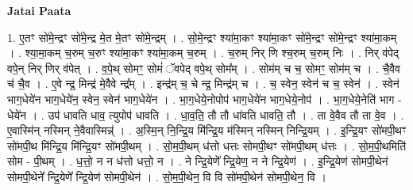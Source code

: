 \documentclass[17pt]{extarticle}
\begin{document}
\textbf{Jatai Paata} \newline

1. ए॒तꣳ सो॑मे॒न्द्रꣳ सो॑मे॒न्द्र मे॒त मे॒तꣳ सो॑मे॒न्द्रम् । . सो॒मे॒न्द्रꣳ श्या॑मा॒कꣳ श्या॑मा॒कꣳ सो॑मे॒न्द्रꣳ सो॑मे॒न्द्रꣳ श्या॑मा॒कम् । . श्या॒मा॒कम् च॒रुम् च॒रुꣳ श्या॑मा॒कꣳ श्या॑मा॒कम् च॒रुम् । . च॒रुम् निर् णि श्च॒रुम् च॒रुम् निः । . निर् व॑पेद् वपे॒न् निर् णिर् व॑पेत् । . व॒पे॒थ् सोमꣳ॒॒ सोमं॑ ॅवपेद् वपे॒थ् सोम᳚म् । . सोम॑म् च च॒ सोमꣳ॒॒ सोम॑म् च । . चै॒वैव च॑ चै॒व । . ए॒वे न्द्र॒ मिन्द्र॑ मे॒वैवे न्द्र᳚म् । . इन्द्र॑म् च॒ चे न्द्र॒ मिन्द्र॑म् च । . च॒ स्वेन॒ स्वेन॑ च च॒ स्वेन॑ । . स्वेन॑ भाग॒धेये॑न भाग॒धेये॑न॒ स्वेन॒ स्वेन॑ भाग॒धेये॑न । . भा॒ग॒धेये॒नोपोप॑ भाग॒धेये॑न भाग॒धेये॒नोप॑ । . भा॒ग॒धेये॒नेति॑ भाग - धेये॑न । . उप॑ धावति धाव॒ त्युपोप॑ धावति । . धा॒व॒ति॒ तौ तौ धा॑वति धावति॒ तौ । . ता वे॒वैव तौ ता वे॒व । . ए॒वास्मि॑न् नस्मिन् ने॒वैवास्मिन्न्॑ । . अ॒स्मि॒न् नि॒न्द्रि॒य मि॑न्द्रि॒य म॑स्मिन् नस्मिन् निन्द्रि॒यम् । . इ॒न्द्रि॒यꣳ सो॑मपी॒थꣳ सो॑मपी॒थ मि॑न्द्रि॒य मि॑न्द्रि॒यꣳ सो॑मपी॒थम् । . सो॒म॒पी॒थम् ध॑त्तो धत्तः सोमपी॒थꣳ सो॑मपी॒थम् ध॑त्तः । . सो॒म॒पी॒थमिति॑ सोम - पी॒थम् । . ध॒त्तो॒ न न ध॑त्तो धत्तो॒ न । . ने न्द्रि॒येणे᳚ न्द्रि॒येण॒ न ने न्द्रि॒येण॑ । . इ॒न्द्रि॒येण॑ सोमपी॒थेन॑ सोमपी॒थेने᳚ न्द्रि॒येणे᳚ न्द्रि॒येण॑ सोमपी॒थेन॑ । . सो॒म॒पी॒थेन॒ वि वि सो॑मपी॒थेन॑ सोमपी॒थेन॒ वि । \newline
\end{document}

